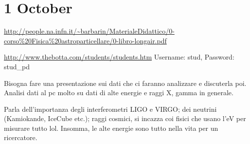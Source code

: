 \documentclass[main.tex]{subfiles}
\begin{document}
\section*{1 October}

\url{http://people.na.infn.it/~barbarin/MaterialeDidattico/0-corso%20Fisica%20astroparticellare/0-libro-longair.pdf}

\url{http://www.thebotta.com/students/students.htm}
Username: stud, Password: stud_pd

Bisogna fare una presentazione sui dati che ci faranno analizzare e discuterla poi. Analisi dati al pc molto su dati di alte energie e raggi X, gamma in generale.

Parla dell'importanza degli interferometri LIGO e VIRGO; dei neutrini (Kamiokande, IceCube etc.); raggi cosmici, si incazza coi fisici che usano l'eV per misurare tutto lol. Insomma, le alte energie sono tutto nella vita per un ricercatore.
\end{document}
